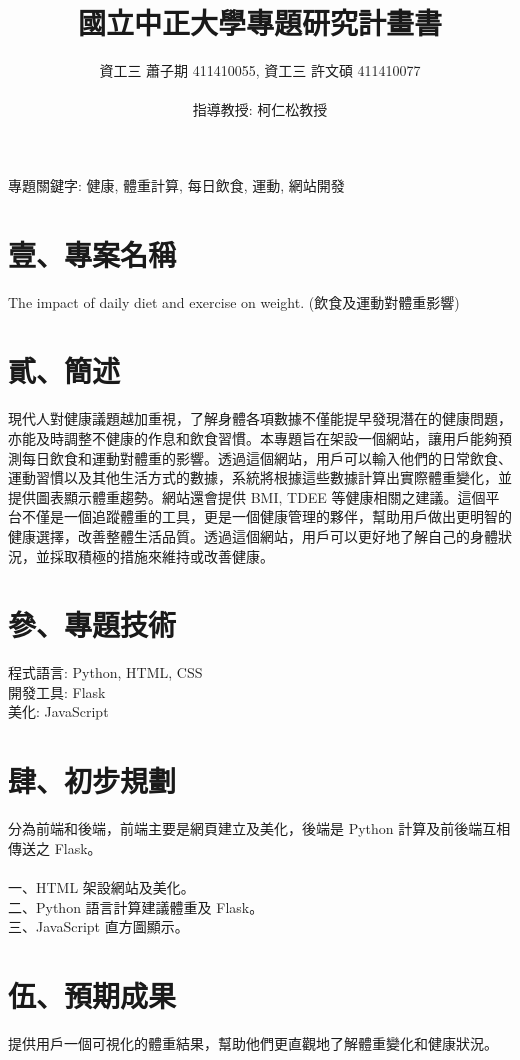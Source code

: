 \documentclass[a4paper]{article}
\begin{document}
\title{\fontsize{16pt}{16pt}\selectfont 國立中正大學專題研究計畫書}
\author{
    資工三 \hspace{0.1 cm} 蕭子期 411410055, 資工三 \hspace{0.1 cm} 許文碩 411410077 \\ \\
    指導教授: 柯仁松教授
}
\date{}
\maketitle
\fontsize{12pt}{12pt}\selectfont
\begin{center}
專題關鍵字: 健康, 體重計算, 每日飲食, 運動, 網站開發
\end{center}
\section*{壹、專案名稱}
\noindent
The impact of daily diet and exercise on weight. (飲食及運動對體重影響)
\section*{貳、簡述}
\noindent
現代人對健康議題越加重視，了解身體各項數據不僅能提早發現潛在的健康問題，亦能及時調整不健康的作息和飲食習慣。本專題旨在架設一個網站，讓用戶能夠預測每日飲食和運動對體重的影響。透過這個網站，用戶可以輸入他們的日常飲食、運動習慣以及其他生活方式的數據，系統將根據這些數據計算出實際體重變化，並提供圖表顯示體重趨勢。網站還會提供 BMI, TDEE 等健康相關之建議。這個平台不僅是一個追蹤體重的工具，更是一個健康管理的夥伴，幫助用戶做出更明智的健康選擇，改善整體生活品質。透過這個網站，用戶可以更好地了解自己的身體狀況，並採取積極的措施來維持或改善健康。
\section*{參、專題技術}
\noindent
程式語言: Python, HTML, CSS \\
開發工具: Flask \\
美化: JavaScript
\section*{肆、初步規劃}
\noindent
分為前端和後端，前端主要是網頁建立及美化，後端是 Python 計算及前後端互相傳送之 Flask。   \\ \\
一、HTML 架設網站及美化。 \\
二、Python 語言計算建議體重及 Flask。 \\
三、JavaScript 直方圖顯示。
\section*{伍、預期成果}
\noindent
提供用戶一個可視化的體重結果，幫助他們更直觀地了解體重變化和健康狀況。
\end{document}
